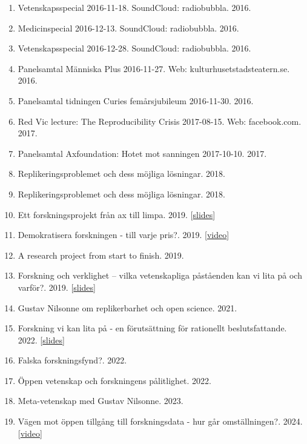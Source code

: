 \documentclass[10pt,a4paper,twocolumn]{article}
\begin{document}
\begin{enumerate}
    \item Vetenskapsspecial 2016-11-18. SoundCloud: radiobubbla. 2016.

    \item Medicinspecial 2016-12-13. SoundCloud: radiobubbla. 2016.

    \item Vetenskapsspecial 2016-12-28. SoundCloud: radiobubbla. 2016.

    \item Panelsamtal Människa Plus 2016-11-27. Web: kulturhusetstadsteatern.se. 2016.

    \item Panelsamtal tidningen Curies femårsjubileum 2016-11-30. 2016.

    \item Red Vic lecture: The Reproducibility Crisis 2017-08-15. Web: facebook.com. 2017.

    \item Panelsamtal Axfoundation: Hotet mot sanningen 2017-10-10. 2017.

    \item Replikeringsproblemet och dess möjliga lösningar. 2018.

    \item Replikeringsproblemet och dess möjliga lösningar. 2018.

    \item Ett forskningsprojekt från ax till limpa. 2019. [\href{https://osf.io/zx59b/}{slides}]

    \item Demokratisera forskningen - till varje pris?. 2019. [\href{https://www.facebook.com/vetenskapoallm/videos/882241585458235/}{video}]

    \item A research project from start to finish. 2019.

    \item Forskning och verklighet – vilka vetenskapliga påståenden kan vi lita på och varför?. 2019. [\href{https://osf.io/y65gr/}{slides}]

    \item Gustav Nilsonne om replikerbarhet och open science. 2021.

    \item Forskning vi kan lita på - en förutsättning för rationellt beslutsfattande. 2022. [\href{https://osf.io/cbtgq/}{slides}]

    \item Falska forskningsfynd?. 2022.

    \item Öppen vetenskap och forskningens pålitlighet. 2022.

    \item Meta-vetenskap med Gustav Nilsonne. 2023.

    \item Vägen mot öppen tillgång till forskningsdata - hur går omställningen?. 2024. [\href{https://www.youtube.com/watch?v=pa9PV9jw5-M}{video}]

\end{enumerate}
\end{document}
